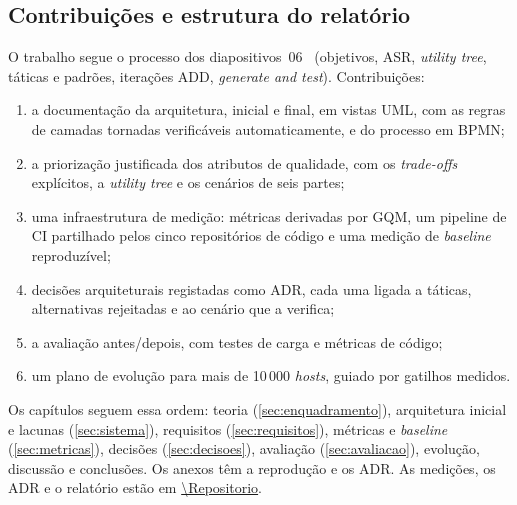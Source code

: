 \subsection{Contribuições e estrutura do relatório}

O trabalho segue o processo dos diapositivos~06~\cite{bastofernandes2026} (objetivos, ASR, \emph{utility tree},
táticas e padrões, iterações ADD, \emph{generate and test}). Contribuições:
\begin{enumerate}
  \item a documentação da arquitetura, inicial e final, em vistas UML, com as regras de camadas tornadas
        verificáveis automaticamente, e do processo em BPMN;
  \item a priorização justificada dos atributos de qualidade, com os \emph{trade-offs} explícitos, a
        \emph{utility tree} e os cenários de seis partes;
  \item uma infraestrutura de medição: métricas derivadas por GQM, um pipeline de CI partilhado pelos
        cinco repositórios de código e uma medição de \emph{baseline} reproduzível;
  \item decisões arquiteturais registadas como ADR, cada uma ligada a táticas, alternativas rejeitadas e
        ao cenário que a verifica;
  \item a avaliação antes/depois, com testes de carga e métricas de código;
  \item um plano de evolução para mais de 10\,000 \emph{hosts}, guiado por gatilhos medidos.
\end{enumerate}

Os capítulos seguem essa ordem: teoria (\ref{sec:enquadramento}), arquitetura inicial e lacunas
(\ref{sec:sistema}), requisitos (\ref{sec:requisitos}), métricas e \emph{baseline} (\ref{sec:metricas}), decisões
(\ref{sec:decisoes}), avaliação (\ref{sec:avaliacao}), evolução, discussão e conclusões. Os anexos têm a reprodução
e os ADR. As medições, os ADR e o relatório estão em \url{\Repositorio}.
